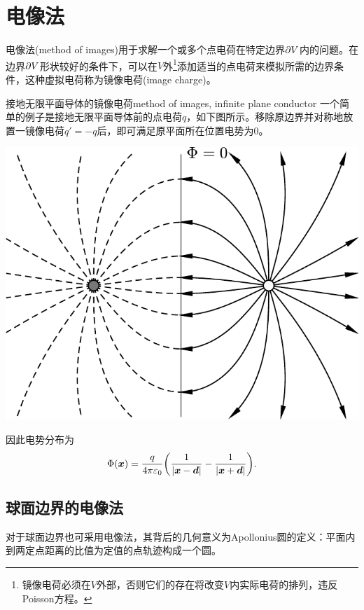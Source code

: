 
\section{电像法}
\label{sec:method of images}

电像法(method of images)用于求解一个或多个点电荷在特定边界$\partial V$内的问题。在边界$\partial V$形状较好的条件下，可以在$V$外\footnote{镜像电荷必须在$V$外部，否则它们的存在将改变$V$内实际电荷的排列，违反Poisson方程。}添加适当的点电荷来模拟所需的边界条件，这种虚拟电荷称为镜像电荷(image charge)。
\begin{example}{接地无限平面导体的镜像电荷}{method of images, infinite plane conductor}
    一个简单的例子是接地无限平面导体前的点电荷$q$，如下图所示。移除原边界并对称地放置一镜像电荷$q'=-q$后，即可满足原平面所在位置电势为0。
    \begin{center}
        \includegraphics[width=0.6\linewidth]{graphs/image_charge_plane.pdf}
        \label{fig:image charge of plane}
    \end{center}
    因此电势分布为
    \begin{equation}
        \Phi(\bm x)=\frac q{4\pi\varepsilon_0}\biggl(\frac1{\left\lvert\bm x-\bm d\right\rvert}-\frac1{\left\lvert\bm x+\bm d\right\rvert}\biggr).
    \end{equation}
\end{example}

\subsection{球面边界的电像法}
\label{ssec:method of images, sphere}

对于球面边界也可采用电像法，其背后的几何意义为Apollonius圆的定义：平面内到两定点距离的比值为定值的点轨迹构成一个圆。%

